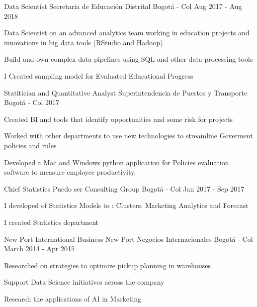 \begin{cventries}

    \cventry
    {Data Scientist }%
    {Secretaria de Educación Distrital} %
    {Bogotá - Col} %
    {Aug 2017 - Aug 2018} %
    {
    \begin{cvitems} 
     \item {Data Scientist on an advanced analytics team working in education projects and innovations in big data tools (RStudio and Hadoop)}
      \item {Build and own complex data pipelines using SQL and other data processing tools}
       \item {I Created sampling model for Evaluated Educational Progress}
       \end{cvitems}
    }



    \cventry
    {Statitician and Quantitative Analyst}%
    {Superintendencia de Puertos y Transporte} %
    {Bogotá - Col} %
    {2017} %
    {
    \begin{cvitems} 
     \item {Created BI and tools that identify opportunities and some risk for projects}
      \item {Worked with other departments to use new technologies to streamline Goverment policies and rules}
       \item {Developed a Mac and Windows python application for Policies evaluation  software to measure employee productivity.}
       \end{cvitems}
    }


    \cventry
    {Chief Statistics}%
    {Puedo ser Consulting Group} %
    {Bogotá - Col} %
    {Jan 2017 - Sep 2017} %
    {
    \begin{cvitems} 
     \item {I developed of Statistics Models to : Clusters, Marketing Analytics and Forecast}
      \item {I created Statistics department }
       \end{cvitems}
    }
    

    \cventry
    {New Port International Business }%
    {New Port Negocios Internacionales} %
    {Bogotá - Col} %
    {March 2014 - Apr 2015} %
    {
    \begin{cvitems} 
     \item {Researched on strategies to optimize pickup planning in warehouses}
      \item {Support Data Science initiatives across the company}
       \item {Research the applications of AI in Marketing}
       \end{cvitems}
    }
    

\end{cventries}
